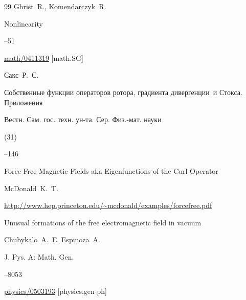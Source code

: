\begin{thebibliography}{99}
\by Ghrist~R., Komendarczyk~R.

\jour Nonlinearity 




--51


\arxiv \href{http://arxiv.org/abs/math/0411319}{math/0411319} [math.SG]




\by Сакс~Р.~С. 

\paper Собственные функции  операторов ротора, градиента дивергенции~и Стокса. Приложения

\jour Вестн. Сам. гос. техн. ун-та. Сер. Физ.-мат. науки


(31)

--146






\eprint  Force-Free Magnetic Fields aka Eigenfunctions of the Curl Operator

\by McDonald~K.~T.


\elink \url{http://www.hep.princeton.edu/~mcdonald/examples/forcefree.pdf}





\paper Unusual formations of the free electromagnetic field in vacuum

\by Chubykalo~A.~E. Espinoza~A. 

\jour J. Pys. A: Math. Gen. 



--8053 



\arxiv \href{http://arxiv.org/abs/physics/0503193}{physics/0503193} [physics.gen-ph]





\end{thebibliography}
